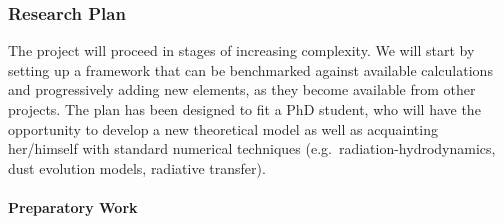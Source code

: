 \documentclass[10pt,fleqn,twoside]{article}
\begin{document}
\subsubsection{Research Plan} 

The project will proceed in stages of increasing complexity. We will start
by setting up a framework that can be benchmarked against available
calculations and progressively adding new elements, as they become
available from other projects. The plan has been designed to fit a
PhD student, who will have the opportunity to develop a new theoretical
model as well as acquainting her/himself with standard numerical
techniques (e.g.\ radiation-hydrodynamics, dust evolution models,
radiative transfer). 


\paragraph{Preparatory Work}
\end{document}
